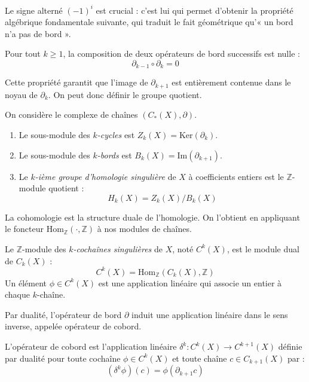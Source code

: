 Le signe alterné $(-1)^i$ est crucial : c'est lui qui permet d'obtenir la propriété algébrique fondamentale suivante, qui traduit le fait géométrique qu'« un bord n'a pas de bord ».

\begin{lemma}
Pour tout $k \geq 1$, la composition de deux opérateurs de bord successifs est nulle :
\[
\partial_{k-1} \circ \partial_k = 0
\]
\end{lemma}

Cette propriété garantit que l'image de $\partial_{k+1}$ est entièrement contenue dans le noyau de $\partial_k$. On peut donc définir le groupe quotient.

\begin{definition}
On considère le complexe de chaînes $(C_*(X), \partial)$.
\begin{enumerate}
    \item Le sous-module des \emph{$k$-cycles} est $Z_k(X) = \text{Ker}(\partial_k)$.
    \item Le sous-module des \emph{$k$-bords} est $B_k(X) = \text{Im}(\partial_{k+1})$.
    \item Le \emph{$k$-ième groupe d'homologie singulière} de $X$ à coefficients entiers est le $\mathbb{Z}$-module quotient :
    \[
    H_k(X) = Z_k(X) / B_k(X)
    \]
\end{enumerate}
\end{definition}


La cohomologie est la structure duale de l'homologie. On l'obtient en appliquant le foncteur $\text{Hom}_\mathbb{Z}(\cdot, \mathbb{Z})$ à nos modules de chaînes.

\begin{definition}
Le $\mathbb{Z}$-module des \emph{$k$-cochaînes singulières} de $X$, noté $C^k(X)$, est le module dual de $C_k(X)$ :
\[
C^k(X) = \text{Hom}_\mathbb{Z}(C_k(X), \mathbb{Z})
\]
Un élément $\phi \in C^k(X)$ est une application linéaire qui associe un entier à chaque $k$-chaîne.
\end{definition}

Par dualité, l'opérateur de bord $\partial$ induit une application linéaire dans le sens inverse, appelée opérateur de cobord.

\begin{definition}
L'opérateur de cobord est l'application linéaire $\delta^k : C^k(X) \to C^{k+1}(X)$ définie par dualité pour toute cochaîne $\phi \in C^k(X)$ et toute chaîne $c \in C_{k+1}(X)$ par :
\[
(\delta^k \phi)(c) = \phi(\partial_{k+1} c)
\]
\end{definition}


